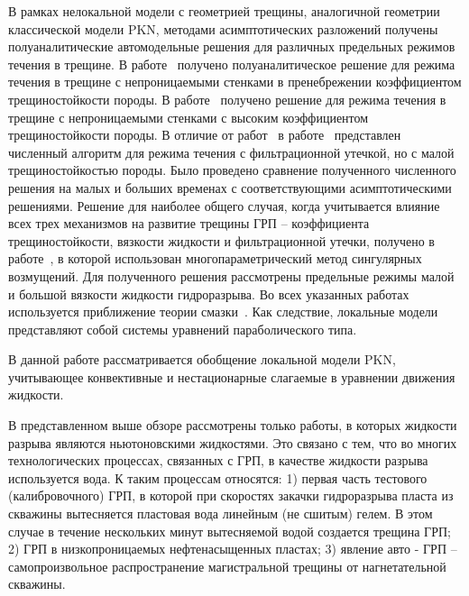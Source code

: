 В рамках нелокальной модели с геометрией трещины, аналогичной геометрии классической модели PKN, методами асимптотических разложений получены полуаналитические автомодельные решения для различных предельных режимов течения в трещине. В работе~\cite{Garagash1} получено полуаналитическое решение для режима течения в трещине с непроницаемыми стенками в пренебрежении коэффициентом трещиностойкости породы. В работе~\cite{Garagash2} получено решение для режима течения в трещине с непроницаемыми стенками с высоким коэффициентом трещиностойкости породы. В отличие от работ~\cite{Garagash1, Garagash2} в работе~\cite{Adachi1} представлен численный алгоритм для режима течения с фильтрационной утечкой, но с малой трещиностойкостью породы. Было проведено сравнение полученного численного решения на малых и больших временах с соответствующими асимптотическими решениями. Решение для наиболее общего случая, когда учитывается влияние всех трех механизмов на развитие трещины ГРП – коэффициента трещиностойкости, вязкости жидкости и фильтрационной утечки, получено в работе~\cite{Mitchell1}, в которой использован многопараметрический метод сингулярных возмущений. Для полученного решения рассмотрены предельные режимы малой и большой вязкости жидкости гидроразрыва. Во всех указанных работах используется приближение теории смазки~\cite{loic1}. Как следствие, локальные модели представляют собой системы уравнений параболического типа.



В данной работе рассматривается обобщение локальной модели PKN, учитывающее конвективные и нестационарные слагаемые в уравнении движения жидкости.




\label{sec:fiz_osn}

В представленном выше обзоре рассмотрены только работы, в которых жидкости разрыва являются ньютоновскими жидкостями. Это связано с тем, что во многих технологических процессах, связанных с ГРП, в качестве жидкости разрыва используется вода. К таким процессам относятся: 1) первая часть тестового (калибровочного) ГРП, в которой при скоростях закачки гидроразрыва пласта из скважины вытесняется пластовая вода линейным (не сшитым) гелем. В этом случае в течение нескольких минут вытесняемой водой создается трещина ГРП; 2) ГРП в низкопроницаемых нефтенасыщенных пластах; 3) явление авто - ГРП – самопроизвольное распространение магистральной трещины от нагнетательной скважины.



